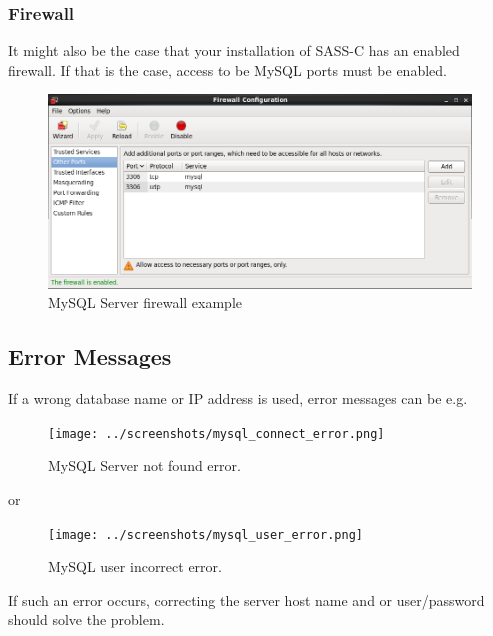\subsubsection{Firewall}

It might also be the case that your installation of SASS-C has an enabled firewall. If that is the case, access to be MySQL ports must be enabled.

\begin{figure}[H]
  \center
    \includegraphics[width=15cm,frame]{../screenshots/centos_firewall.png}
  \caption{MySQL Server firewall example}
\end{figure}

\subsection{Error Messages}

If a wrong database name or IP address is used, error messages can be e.g. \\

\begin{figure}[H]
  \center
    \texttt{[image: ../screenshots/mysql\_connect\_error.png]}
  \caption{MySQL Server not found error.}
\end{figure}

 or 

\begin{figure}[H]
  \center
    \texttt{[image: ../screenshots/mysql\_user\_error.png]}
  \caption{MySQL user incorrect error.}
\end{figure}

If such an error occurs, correcting the server host name and or user/password should solve the problem. 
